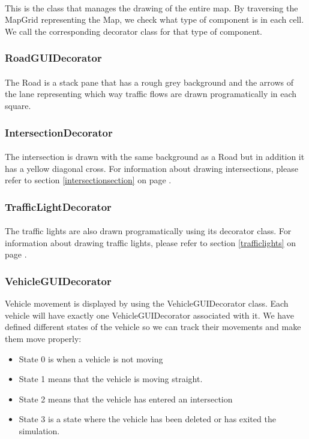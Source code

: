 \documentclass[a4paper,11pt,titlepage]{article}
\begin{document}
\paragraph{}
This is the class that manages the drawing of the entire map. By traversing the MapGrid representing the Map, we check what type of component is in each cell. We call the corresponding decorator class for that type of component. 
\subsubsection{RoadGUIDecorator}
\paragraph{}
The Road is a stack pane that has a rough grey background and the arrows of the lane representing which way traffic flows are drawn programatically in each square.
\subsubsection{IntersectionDecorator}
\paragraph{}
The intersection is drawn with the same background as a Road but in addition it has a yellow diagonal cross. For information about drawing intersections, please refer to section \ref{intersectionsection} on page \pageref{intersectionsection}.
\subsubsection{TrafficLightDecorator}
\paragraph{}
The traffic lights are also drawn programatically using its decorator class. For information about drawing traffic lights, please refer to section \ref{trafficlights} on page \pageref{trafficlights}.
\subsubsection{VehicleGUIDecorator}
Vehicle movement is displayed by using the VehicleGUIDecorator class. 
Each vehicle will have exactly one VehicleGUIDecorator associated with it. We have defined different states of the vehicle so we can track their movements and make them move properly:
\begin{itemize}\itemsep1pt \parskip0pt 
\item State 0 is when a vehicle is not moving
\item State 1 means that the vehicle is moving straight.
\item State 2 means that the vehicle has entered an intersection
\item State 3 is a state where the vehicle has been deleted or has exited the simulation.
\end{itemize} 
\end{document}
